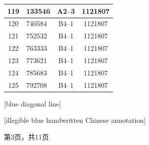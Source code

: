 \documentclass[UTF8,10pt,a4paper,fontset=fandol]{ctexart}
\newcommand{\fieldvalue}[1]{#1}
\newcommand{\handwritten}[1]{#1}
\begin{document}
\begin{center}
\begin{tabular}{|c|l|c|c|}
\fieldvalue{119} &
\fieldvalue{133546} &
\fieldvalue{A2--3} &
\fieldvalue{1121807}
\\ \hline
\fieldvalue{120} &
\fieldvalue{740584} &
\fieldvalue{B4--1} &
\fieldvalue{1121807}
\\ \hline
\fieldvalue{121} &
\fieldvalue{752532} &
\fieldvalue{B4--1} &
\fieldvalue{1121807}
\\ \hline
\fieldvalue{122} &
\fieldvalue{763333} &
\fieldvalue{B4--1} &
\fieldvalue{1121807}
\\ \hline
\fieldvalue{123} &
\fieldvalue{773621} &
\fieldvalue{B4--1} &
\fieldvalue{1121807}
\\ \hline
\fieldvalue{124} &
\fieldvalue{785683} &
\fieldvalue{B4--1} &
\fieldvalue{1121807}
\\ \hline
\fieldvalue{125} &
\fieldvalue{792708} &
\fieldvalue{B4--1} &
\fieldvalue{1121807}
\\ \hline
\end{tabular}

\handwritten{[blue diagonal line]}

\handwritten{[illegible blue handwritten Chinese annotation]}

\medskip

第3页，共11页
\end{center}
\end{document}
